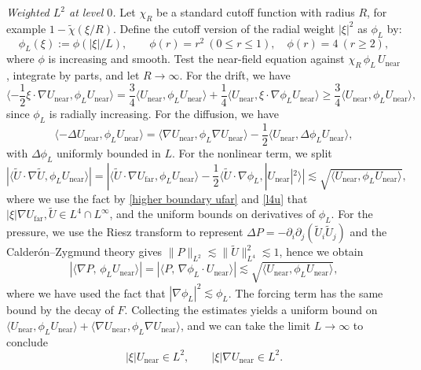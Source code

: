 \documentclass[11pt,a4paper]{article}
\numberwithin{equation}{section}
\newcommand{\assign}{:=}
\newcommand{\cdummy}{\cdot}
\newcommand{\tmop}[1]{\ensuremath{\operatorname{#1}}}
\begin{document}
 \smallskip
\noindent\emph{Weighted $L^2$ at level $0$.}
Let $\chi_R$ be a standard cutoff function with radius $R$, for example $1-\widetilde{\chi}(\xi/R)$. Define the cutoff version of the radial weight $|\xi|^2$ as $\phi_{L}$ by:
\[
\phi_L(\xi) \assign \phi\left(|\xi|/L\right), 
\qquad 
\phi(r) = r^2 \ (0 \leqslant r \leqslant 1), \quad \phi(r) = 4 \ (r \geqslant 2),
\]
where $\phi$ is increasing and smooth.
Test the near-field equation against $\chi_R\,\phi_L\,U_{\mathrm{near}}$, integrate by parts, and let $R\to\infty$. For the drift, we have \[\langle - \frac{1}{2} \xi \cdummy \nabla
       U_{\tmop{near}},\phi_{L}U_{\tmop{near}}\rangle=\frac34\langle 
       U_{\tmop{near}},\phi_{L}U_{\tmop{near}}\rangle+\frac{1}{4}\langle 
       U_{\tmop{near}},\xi\cdot\nabla\phi_{L}U_{\tmop{near}}\rangle \geqslant \frac34\langle 
       U_{\tmop{near}},\phi_{L}U_{\tmop{near}}\rangle,\] since $\phi_L$ is radially increasing. For the diffusion,  we have\[\langle - \Delta
       U_{\tmop{near}},\phi_{L}U_{\tmop{near}}\rangle=\langle \nabla
       U_{\tmop{near}},\phi_{L}\nabla U_{\tmop{near}}\rangle-\frac12\langle 
       U_{\tmop{near}},\Delta \phi_{L}U_{\tmop{near}}\rangle,\]
with $\Delta\phi_L$ uniformly bounded in $L$. For the nonlinear term, we split\[|\langle \widetilde{U} \cdot \nabla \widetilde{U},\phi_{L} U_{\tmop{near}}\rangle|=|\langle \widetilde{U} \cdot \nabla U_{\tmop{far}},\phi_{L} U_{\tmop{near}}\rangle-\frac12\langle \widetilde{U}  \cdot\nabla \phi_{L}, |U_{\tmop{near}}|^2\rangle|\lesssim\sqrt{\langle 
       U_{\tmop{near}},\phi_{L}U_{\tmop{near}}\rangle},\]
       where we use the fact by \eqref{higher boundary ufar} and \eqref{l4u} that $|\xi|\nabla U_{\tmop{far}}, \widetilde{U}\in L^4\cap L^\infty$, and the uniform bounds on derivatives of $\phi_L$. For the pressure, we use the Riesz transform to represent $\Delta P=-\partial_i\partial_j(\widetilde U_i\widetilde U_j)$ and the Calder\'on--Zygmund theory gives $\|P\|_{L^2}\lesssim \|\widetilde{U}\|^2_{L^4}\lesssim1$, hence we obtain
\[
|\langle \nabla P,\,\phi_L U_{\mathrm{near}}\rangle|
=|\langle P,\,\nabla\phi_L\cdot U_{\mathrm{near}}\rangle|\lesssim
\sqrt{\langle 
       U_{\tmop{near}},\phi_{L}U_{\tmop{near}}\rangle},
\] where we have used the fact that $|\nabla\phi_L|^2\lesssim \phi_L$. The forcing term has the same bound by the decay of $F$. Collecting the estimates yields a uniform bound on $\langle 
       U_{\tmop{near}},\phi_{L}U_{\tmop{near}}\rangle+\langle \nabla
       U_{\tmop{near}},\phi_{L}\nabla U_{\tmop{near}}\rangle$, and we can take the limit $L \rightarrow \infty$ to conclude \[|\xi|U_{\tmop{near}} \in L^2, \quad \quad|\xi|\nabla U_{\tmop{near}}\in L^2.\]
\end{document}
